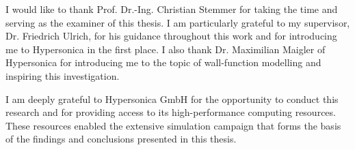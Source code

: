 I would like to thank Prof. Dr.-Ing. Christian Stemmer for taking the time and serving as the examiner of this thesis. I am particularly grateful to my supervisor, Dr. Friedrich Ulrich, for his guidance throughout this work and for introducing me to Hypersonica in the first place. I also thank Dr. Maximilian Maigler of Hypersonica for introducing me to the topic of wall-function modelling and inspiring this investigation.

I am deeply grateful to Hypersonica GmbH for the opportunity to conduct this research and for providing access to its high-performance computing resources. These resources enabled the extensive simulation campaign that forms the basis of the findings and conclusions presented in this thesis.